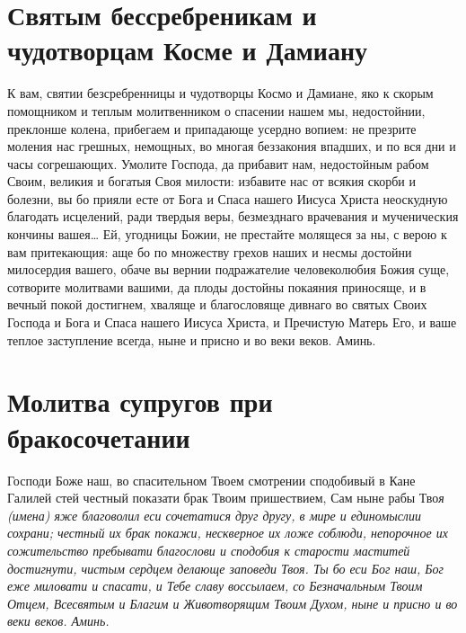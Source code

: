 \section{Святым бессребреникам и чудотворцам Косме и Дамиану}\begin{mymulticols}



К вам, святии безсребренницы и чудотворцы Космо и Дамиане, яко к скорым помощником и теплым молитвенником о спасении нашем мы, недостойнии, преклонше колена, прибегаем и припадающе усердно вопием: не презрите моления нас грешных, немощных, во многая беззакония впадших, и по вся дни и часы согрешающих. Умолите Господа, да прибавит нам, недостойным рабом Своим, великия и богатыя Своя милости: избавите нас от всякия скорби и болезни, вы бо прияли есте от Бога и Спаса нашего Иисуса Христа неоскудную благодать исцелений, ради твердыя веры, безмезднаго врачевания и мученическия кончины вашея… Ей, угодницы Божии, не престайте молящеся за ны, с верою к вам притекающия: аще бо по множеству грехов наших и несмы достойни милосердия вашего, обаче вы вернии подражателие человеколюбия Божия суще, сотворите молитвами вашими, да плоды достойны покаяния приносяще, и в вечный покой достигнем, хваляще и благословяще дивнаго во святых Своих Господа и Бога и Спаса нашего Иисуса Христа, и Пречистую Матерь Его, и ваше теплое заступление всегда, ныне и присно и во веки веков. Аминь.





\end{mymulticols}

\section{Молитва супругов при бракосочетании}\begin{mymulticols}


Господи Боже наш, во спасительном Твоем смотрении сподобивый в Кане Галилей стей честный показати брак Твоим пришествием, Сам ныне рабы Тво\itshape я (имен\normalfont{}а) яже благоволил еси сочетатися друг другу, в мире и единомыслии сохрани; честный их брак покажи, нескверное их ложе соблюди, непорочное их сожительство пребывати благослови и сподобия к старости маститей достигнути, чистым сердцем делающе заповеди Твоя. Ты бо еси Бог наш, Бог еже миловати и спасати, и Тебе славу воссылаем, со Безначальным Твоим Отцем, Всесвятым и Благим и Животворящим Твоим Духом, ныне и присно и во веки веков. Аминь.





\end{mymulticols}

